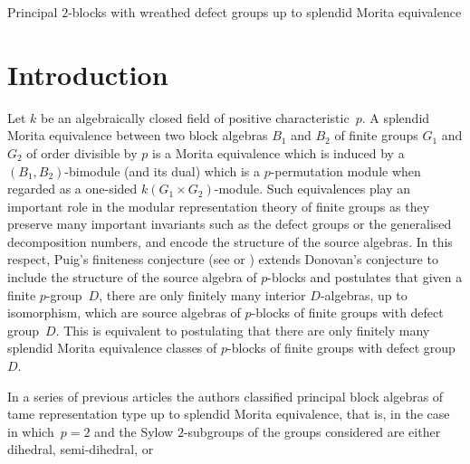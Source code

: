 \documentclass[12pt,a4paper]{amsart}
\theoremstyle{plain}\newtheorem{Theorem}{Theorem}[section]
\theoremstyle{plain}\newtheorem{Conjecture}[Theorem]{Conjecture}
\theoremstyle{plain}\newtheorem{Corollary}[Theorem]{Corollary}
\theoremstyle{plain}\newtheorem{Lemma}[Theorem]{Lemma}
\theoremstyle{plain}\newtheorem{Proposition}[Theorem]{Proposition}
\theoremstyle{definition}\newtheorem{Definition}[Theorem]{Definition}
\theoremstyle{definition}\newtheorem{Example}[Theorem]{Example}
\theoremstyle{definition}\newtheorem{Examples}[Theorem]{Examples}
\theoremstyle{definition}\newtheorem{Remark}[Theorem]{Remark}
\theoremstyle{definition}\newtheorem{Question}[Theorem]{Question}
\theoremstyle{definition}\newtheorem{Notation}[Theorem]{Notation}
\theoremstyle{definition}\newtheorem{Hypothesis}[Theorem]{Hypothesis}
\theoremstyle{definition}\newtheorem{Assumption}[Theorem]{Assumption}
\theoremstyle{definition}\newtheorem{Strategy}[Theorem]{Strategy}
\theoremstyle{definition}\newtheorem{Contents}[Theorem]{Contents}
\theoremstyle{definition}\newtheorem{Computations}[Theorem]{Computations}
\theoremstyle{definition}\newtheorem{Equivalences}[Theorem]{Equivalences}
\theoremstyle{definition}\newtheorem{Notation/Definition}[Theorem]{Notation/Definition}
\theoremstyle{definition}\newtheorem{noth}[Theorem]{}
\theoremstyle{plain}\newtheorem{Step}[Theorem]{Step}
\begin{document}
\maketitle



\pagestyle{myheadings} 
{Principal $2$-blocks with wreathed defect groups up to splendid Morita equivalence}










\section{Introduction}
Let $k$ be an algebraically closed field of positive characteristic~$p$. 
A splendid Morita equivalence between two block algebras $B_1$ and $B_2$ 
of finite groups $G_1$ and $G_2$ of order divisible by $p$ is 
a Morita equivalence which is induced by a $(B_1,B_2)$-bimodule 
(and its dual) which is a $p$-permutation module when regarded 
as a one-sided $k(G_1\times G_2)$-module. 
Such equivalences play an important role in the modular representation 
theory of finite groups as they  preserve many important invariants 
such as the defect groups or the generalised decomposition numbers, 
and encode the structure of the source algebras. In this respect,  
Puig's finiteness conjecture
(see \cite[6.2]{Bro94} or \cite[Conjecture 6.4.2]{Lin18})
extends Donovan's conjecture to 
include the structure of the source algebra of $p$-blocks 
and  postulates that given  a  finite $p$-group~$D$,  there  are  only finitely  
many  interior $D$-algebras, up  to  isomorphism,   
which  are  source algebras of $p$-blocks of 
finite groups with defect group~$D$. This is equivalent 
to postulating that there are only finitely many splendid Morita equivalence 
classes of $p$-blocks of finite groups with defect group~$D$.
\par
In a series of previous articles \cite{KL20a,KL20b,KLS20} 
the authors classified principal block algebras of tame representation type 
up to splendid Morita equivalence, that is, in the case in which~$p=2$ and 
the Sylow $2$-subgroups of the groups considered are either dihedral, semi-dihedral, or 
\end{document}
